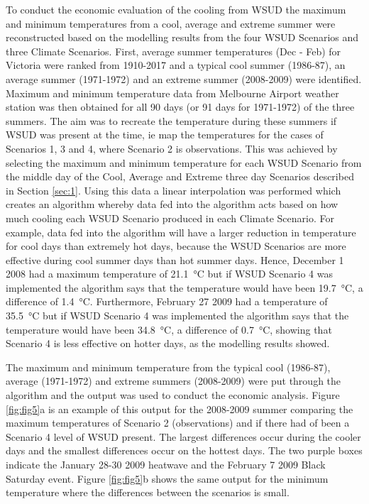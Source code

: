 \documentclass[final,3p,times,authoryear]{elsarticle}
\begin{document}
To conduct the economic evaluation of the cooling from WSUD the maximum and minimum temperatures from a cool, average and extreme summer were reconstructed based on the modelling results from the four WSUD Scenarios and three Climate Scenarios. First, average summer temperatures (Dec - Feb) for Victoria were ranked from 1910-2017 and a typical cool summer (1986-87), an average summer (1971-1972) and an extreme summer (2008-2009) were identified. Maximum and minimum temperature data from Melbourne Airport weather station was then obtained for all 90 days (or 91 days for 1971-1972) of the three summers. The aim was to recreate the temperature during these summers if WSUD was present at the time, ie map the temperatures for the cases of Scenarios 1, 3 and 4, where Scenario 2 is observations. This was achieved by selecting the maximum and minimum temperature for each WSUD Scenario from the middle day of the Cool, Average and Extreme three day Scenarios described in Section \ref{sec:1}. Using this data a linear interpolation was performed which creates an algorithm whereby data fed into the algorithm acts based on how much cooling each WSUD Scenario produced in each Climate Scenario. For example, data fed into the algorithm will have a larger reduction in temperature for cool days than extremely hot days, because the WSUD Scenarios are more effective during cool summer days than hot summer days. Hence, December 1 2008 had a maximum temperature of 21.1\SI{}{\degreeCelsius} but if WSUD Scenario 4 was implemented the algorithm says that the temperature would have been 19.7\SI{}{\degreeCelsius}, a difference of 1.4\SI{}{\degreeCelsius}. Furthermore, February 27 2009 had a temperature of 35.5\SI{}{\degreeCelsius} but if WSUD Scenario 4 was implemented the algorithm says that the temperature would have been 34.8\SI{}{\degreeCelsius}, a difference of 0.7\SI{}{\degreeCelsius}, showing that Scenario 4 is less effective on hotter days, as the modelling results showed.

The maximum and minimum temperature from the typical cool (1986-87), average (1971-1972) and extreme summers (2008-2009) were put through the algorithm and the output was used to conduct the economic analysis. Figure \ref{fig:fig5}a is an example of this output for the 2008-2009 summer comparing the maximum temperatures of Scenario 2 (observations) and if there had of been a Scenario 4 level of WSUD present. The largest differences occur during the cooler days and the smallest differences occur on the hottest days. The two purple boxes indicate the January 28-30 2009 heatwave and the February 7 2009 Black Saturday event. Figure \ref{fig:fig5}b shows the same output for the minimum temperature where the differences between the scenarios is small.
\end{document}
